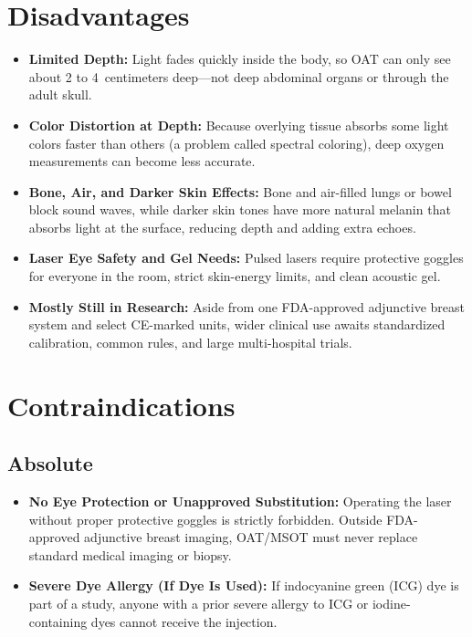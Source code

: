 \section{Disadvantages}
\begin{itemize}
  \item \textbf{Limited Depth:} Light fades quickly inside the body, so OAT can only see about 2 to 4~centimeters deep---not deep abdominal organs or through the adult skull.
  \item \textbf{Color Distortion at Depth:} Because overlying tissue absorbs some light colors faster than others (a problem called spectral coloring), deep oxygen measurements can become less accurate.
  \item \textbf{Bone, Air, and Darker Skin Effects:} Bone and air-filled lungs or bowel block sound waves, while darker skin tones have more natural melanin that absorbs light at the surface, reducing depth and adding extra echoes.
  \item \textbf{Laser Eye Safety and Gel Needs:} Pulsed lasers require protective goggles for everyone in the room, strict skin-energy limits, and clean acoustic gel.
  \item \textbf{Mostly Still in Research:} Aside from one FDA-approved adjunctive breast system and select CE-marked units, wider clinical use awaits standardized calibration, common rules, and large multi-hospital trials.
\end{itemize}

\section{Contraindications}

\subsection{Absolute}
\begin{itemize}
  \item \textbf{No Eye Protection or Unapproved Substitution:} Operating the laser without proper protective goggles is strictly forbidden. Outside FDA-approved adjunctive breast imaging, OAT/MSOT must never replace standard medical imaging or biopsy.
  \item \textbf{Severe Dye Allergy (If Dye Is Used):} If indocyanine green (ICG) dye is part of a study, anyone with a prior severe allergy to ICG or iodine-containing dyes cannot receive the injection.
\end{itemize}

